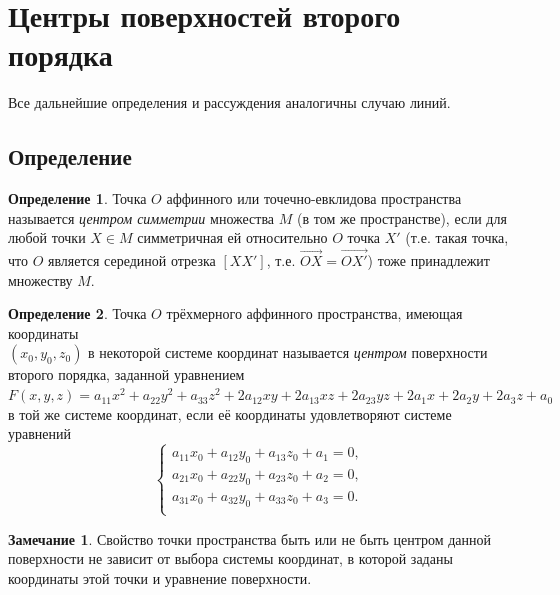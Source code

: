 \documentclass[a4paper, 12pt]{article}
\theoremstyle{definition}
\newtheorem*{definition}{Определение}
\newtheorem*{remark}{Замечание}
\begin{document}
\section{Центры поверхностей второго порядка}
Все дальнейшие определения и рассуждения аналогичны случаю линий.

\subsection{Определение}
\begin{definition}
    Точка $O$ аффинного или точечно-евклидова пространства называется \textit{центром симметрии} множества $M$ (в том же пространстве), если для любой точки $X \in M$ симметричная ей относительно $O$ точка $X'$ (т.е. такая точка, что $O$ является серединой отрезка $[XX']$, т.е. $\overrightarrow{OX} = \overrightarrow{OX'}$) тоже принадлежит множеству $M$.
\end{definition}

\begin{definition}
    Точка $O$ трёхмерного аффинного пространства, имеющая координаты \\ $(x_0, y_0, z_0)$ в некоторой системе координат называется \textit{центром} поверхности второго порядка, заданной уравнением $F(x, y, z) = a_{11} x^2 + a_{22} y^2 + a_{33} z^2 + 2a_{12} xy + 2a_{13} xz + 2a_{23} yz + 2a_1 x + 2a_2 y + 2a_3 z + a_0$ в той же системе координат, если её координаты удовлетворяют системе уравнений
    \[
    \begin{cases}
        a_{11} x_0 + a_{12} y_0 + a_{13} z_0 + a_1 = 0, \\
        a_{21} x_0 + a_{22} y_0 + a_{23} z_0 + a_2 = 0, \\
        a_{31} x_0 + a_{32} y_0 + a_{33} z_0 + a_3 = 0. \\
    \end{cases}
    \]
\end{definition}

\begin{remark}
    Свойство точки пространства быть или не быть центром данной поверхности не зависит от выбора системы координат, в которой заданы координаты этой точки и уравнение поверхности.
\end{remark}
\end{document}
